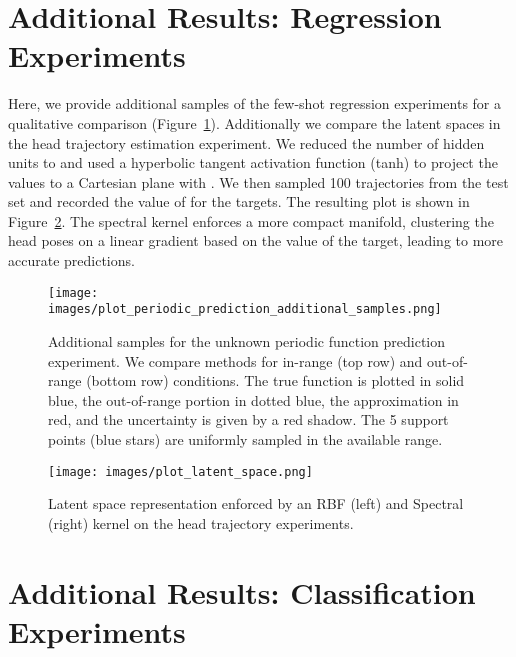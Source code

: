 \documentclass{article}
\begin{document}
\section{Additional Results: Regression Experiments}
\label{sec:appendix_results_regression}

Here, we provide additional samples of the few-shot regression experiments for a qualitative comparison (Figure~\ref{fig_plot_periodic_additional}). Additionally we compare the latent spaces in the head trajectory estimation experiment. We reduced the number of hidden units to  and used a hyperbolic tangent activation function (tanh) to project the values to a Cartesian plane with . We then sampled 100 trajectories from the test set and recorded the value of  for the targets. The resulting plot is shown in Figure~\ref{fig_latent_space_comparison}.  The spectral kernel enforces a more compact manifold, clustering the head poses on a linear gradient based on the value of the target, leading to more accurate predictions.

\begin{figure}[H]
\centerline{
\texttt{[image: images/plot\_periodic\_prediction\_additional\_samples.png]}}
\caption{Additional samples for the unknown periodic function prediction experiment. We compare methods for in-range (top row) and out-of-range (bottom row) conditions. The true function is plotted in solid blue, the out-of-range portion in dotted blue, the approximation in red, and the uncertainty is given by a red shadow. The 5 support points (blue stars) are uniformly sampled in the available range.}
\label{fig_plot_periodic_additional}
\end{figure}

\begin{figure}[H]
\centerline{
\texttt{[image: images/plot\_latent\_space.png]}}
\caption{Latent space representation enforced by an RBF (left) and Spectral (right) kernel on the head trajectory experiments.}
\label{fig_latent_space_comparison}
\end{figure}

\section{Additional Results: Classification Experiments}
\label{sec:appendix_results_classification}
\end{document}
